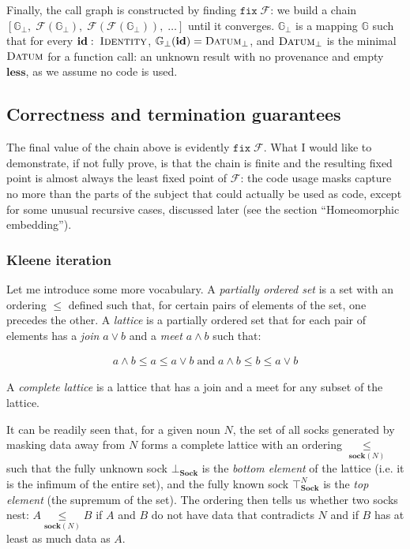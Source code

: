 \documentclass[twoside]{article}
\newcommand{\mathand}{\wedge}
\newcommand{\mathor}{\vee}
\begin{document}
\noindent
Finally, the call graph is constructed by finding $\mathtt{fix}\;\mathcal{F}$: we build a chain $\left[\mathbb{G}_\bot,\;\mathcal{F}(\mathbb{G}_\bot),\;\mathcal{F}(\mathcal{F}(\mathbb{G}_\bot)),\;\ldots{}\right]$ until it converges. $\mathbb{G}_\bot$ is a mapping $\mathbb{G}$ such that for every $\mathbf{id}:\;\textsc{Identity}$, $\mathbb{G}_\bot (\mathbf{id}) =  \textsc{Datum}_\bot$, and $\textsc{Datum}_\bot$ is the minimal $\textsc{Datum}$ for a function call: an unknown result with no provenance and empty $\mathbf{less}$, as we assume no code is used.

\subsection{Correctness and termination guarantees}

The final value of the chain above is evidently $\mathtt{fix}\;\mathcal{F}$. What I would like to demonstrate, if not fully prove, is that the chain is finite and the resulting fixed point is almost always the least fixed point of $\mathcal{F}$: the code usage masks capture no more than the parts of the subject that could actually be used as code, except for some unusual recursive cases, discussed later (see the section ``Homeomorphic embedding'').

\subsubsection{Kleene iteration}

Let me introduce some more vocabulary. A \emph{partially ordered set} is a set with an ordering $\leq$ defined such that, for certain pairs of elements of the set, one precedes the other. A \emph{lattice} is a partially ordered set that for each pair of elements has a \emph{join} $a \mathor b$ and a \emph{meet} $a \mathand b$ such that:

\begin{align*}
a \mathand b \leq a \leq a \mathor b \; \text{and} \; a \mathand b \leq b \leq a \mathor b
\end{align*}

\noindent
A \emph{complete lattice} is a lattice that has a join and a meet for any subset of the lattice.

It can be readily seen that, for a given noun $N$, the set of all socks generated by masking data away from $N$ forms a complete lattice with an ordering $\underset{\mathbf{sock}(N)}{\leq}$ such that the fully unknown sock $\bot_{\mathbf{Sock}}$ is the \emph{bottom element} of the lattice (i.e. it is the infimum of the entire set), and the fully known sock $\top_{\mathbf{Sock}}^{N}$ is the \emph{top element} (the supremum of the set). The ordering then tells us whether two socks nest: $A \underset{\mathbf{sock}(N)}{\leq} B$ if $A$ and $B$ do not have data that contradicts $N$ and if $B$ has at least as much data as $A$.
\end{document}
